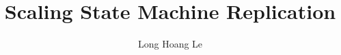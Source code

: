 \documentclass[]{usiinfthesis}
\title{Scaling State Machine Replication} %
\author{Long Hoang Le} %
\begin{document}
\maketitle %

\frontmatter %







\tableofcontents
\listoffigures %
\listoftables %

\mainmatter

















\backmatter

% 
% 


\cleardoublepage
\theindex %
\end{document}
